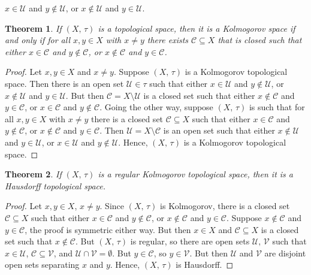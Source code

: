 \documentclass{article}
\theoremstyle{plain}
\newtheorem{theorem}{Theorem}[section]
\theoremstyle{normal}
\begin{document}
        $x\in\mathcal{U}$ and $y\not\in\mathcal{U}$, or
        $x\not\in\mathcal{U}$ and $y\in\mathcal{U}$.
        \begin{theorem}
            If $(X,\,\tau)$ is a topological space, then it is a Kolmogorov
            space if and only if for all $x,y\in{X}$ with $x\ne{y}$ there
            exists $\mathcal{C}\subseteq{X}$ that is closed such that either
            $x\in\mathcal{C}$ and $y\notin\mathcal{C}$, or
            $x\notin\mathcal{C}$ and $y\in\mathcal{C}$.
        \end{theorem}
        \begin{proof}
            Let $x,y\in{X}$ and $x\ne{y}$. Suppose $(X,\,\tau)$ is a Kolmogorov
            topological space. Then there is an open set $\mathcal{U}\in\tau$
            such that either $x\in\mathcal{U}$ and $y\notin\mathcal{U}$, or
            $x\notin\mathcal{U}$ and $y\in\mathcal{U}$. But then
            $\mathcal{C}=X\setminus\mathcal{U}$ is a closed set such that either
            $x\notin\mathcal{C}$ and $y\in\mathcal{C}$, or
            $x\in\mathcal{C}$ and $y\notin\mathcal{C}$. Going the other way,
            suppose $(X,\,\tau)$ is such that for all $x,y\in{X}$ with
            $x\ne{y}$ there is a closed set $\mathcal{C}\subseteq{X}$ such
            that either $x\in\mathcal{C}$ and $y\notin\mathcal{C}$, or
            $x\notin\mathcal{C}$ and $y\in\mathcal{C}$. Then
            $\mathcal{U}=X\setminus\mathcal{C}$ is an open set such that either
            $x\notin\mathcal{U}$ and $y\in\mathcal{U}$, or
            $x\in\mathcal{U}$ and $y\notin\mathcal{U}$. Hence,
            $(X,\,\tau)$ is a Kolmogorov topological space.
        \end{proof}
        \begin{theorem}
            If $(X,\,\tau)$ is a regular Kolmogorov topological space, then
            it is a Hausdorff topological space.
        \end{theorem}
        \begin{proof}
            Let $x,y\in{X}$, $x\ne{y}$. Since $(X,\,\tau)$ is
            Kolmogorov, there is a closed set $\mathcal{C}\subseteq{X}$ such
            that either $x\in\mathcal{C}$ and $y\notin\mathcal{C}$, or
            $x\notin\mathcal{C}$ and $y\in\mathcal{C}$. Suppose
            $x\notin\mathcal{C}$ and $y\in\mathcal{C}$, the proof is symmetric
            either way. But then $x\in{X}$ and $\mathcal{C}\subseteq{X}$ is a
            closed set such that $x\notin\mathcal{C}$. But $(X,\,\tau)$ is
            regular, so there are open sets $\mathcal{U},\,\mathcal{V}$ such
            that $x\in\mathcal{U}$, $\mathcal{C}\subseteq\mathcal{V}$, and
            $\mathcal{U}\cap\mathcal{V}=\emptyset$. But
            $y\in\mathcal{C}$, so $y\in\mathcal{V}$. But then $\mathcal{U}$
            and $\mathcal{V}$ are disjoint open sets separating $x$ and $y$.
            Hence, $(X,\,\tau)$ is Hausdorff.
        \end{proof}
\end{document}
